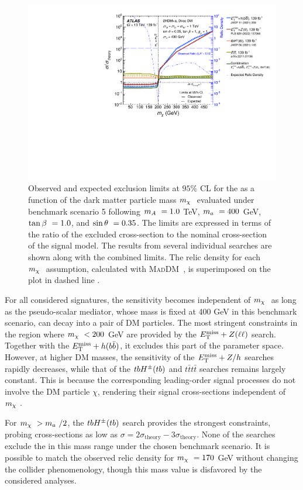 \begin{figure}[h!]
    \centering
    \includegraphics[width=0.6\linewidth]{figures/fig_08.pdf}
    \caption{Observed and expected exclusion limits at $95\%$ CL for the \thdma as a function of the dark matter particle mass $m_{\chi}~$ evaluated under benchmark scenario 5 following $m_A~=1.0$ TeV, $m_a~=400$ GeV, $\tan\beta~=1.0$, and $\sin\theta~=0.35$. The limits are expressed in terms of the ratio of the excluded cross-section to the nominal cross-section of the signal model. The results from several individual searches are shown along with the combined limits. The relic density for each $m_{\chi}~$ assumption, calculated with \textsc{MadDM}~\cite{Ambrogi:2018jqj}, is superimposed on the plot in dashed line \cite{2hdma_comb}. }
    \label{fig:result-mX-scan}
\end{figure} 

For all considered signatures, the sensitivity becomes independent of $m_{\chi}~$ as long as the pseudo-scalar mediator, whose mass is fixed at 400 GeV in this benchmark scenario, can decay into a pair of DM particles. The most stringent constraints in the region where $m_{\chi}~<200$ GeV are provided by the $E_{\mathrm{T}}^{\mathrm{miss}}+Z(\ell\ell)$ search. Together with the $E_{\mathrm{T}}^{\mathrm{miss}}+h(b\bar{b})$, it excludes this part of the parameter space. However, at higher DM masses, the sensitivity of the $E_{\mathrm{T}}^{\mathrm{miss}}+Z/h$ searches rapidly decreases, while that of the $tbH^{\pm}(tb)$ and $t\bar{t}t\bar{t}$ searches remains largely constant. This is because the corresponding leading-order signal processes do not involve the DM particle $\chi$, rendering their signal cross-sections independent of $m_{\chi}~$. 

For $m_{\chi}~>m_a~/2$, the $tbH^{\pm}(tb)$ search provides the strongest constraints, probing cross-sections as low as $\sigma =2\sigma_{\mathrm{theory}} - 3\sigma_{\mathrm{theory}}$. None of the searches exclude the \thdma in this mass range under the chosen benchmark scenario. It is possible to match the observed relic density for $m_{\chi}~=170$ GeV without changing the collider phenomenology, though this mass value is disfavored by the considered analyses. 

